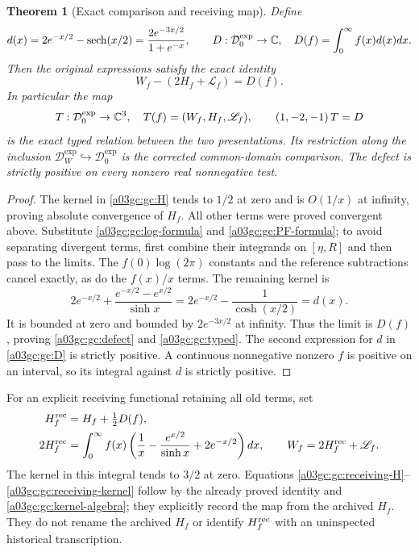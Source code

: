 \documentclass[11pt,a4paper]{article}
\newtheorem{theorem}{Theorem}[section]
\begin{document}
\begin{theorem}[Exact comparison and receiving map]
Define
\begin{equation}
 d(x)=2e^{-x/2}-\operatorname{sech}(x/2)
     =\frac{2e^{-3x/2}}{1+e^{-x}},\qquad
 D:\mathcal D_0^{\exp}\to\mathbb C,\quad D(f)=\int_0^\infty f(x)d(x)dx.
 \label{a03gc:gc:D}
\end{equation}
Then the original expressions satisfy the exact identity
\begin{equation}
 \boxed{W_f-(2H_f+\mathscr L_f)=D(f).}
 \label{a03gc:gc:defect}
\end{equation}
In particular the map
\begin{equation}
 T:\mathcal D_0^{\exp}\to\mathbb C^3,\quad T(f)=(W_f,H_f,\mathscr L_f),
 \qquad (1,-2,-1)\,T=D
 \label{a03gc:gc:typed}
\end{equation}
is the exact typed relation between the two presentations.  Its restriction
along the inclusion $\mathcal D_W^{\exp}\hookrightarrow\mathcal D_0^{\exp}$
is the corrected common-domain comparison.
The defect is strictly positive on every nonzero real nonnegative test.
\end{theorem}
\begin{proof}
The kernel in \eqref{a03gc:gc:H} tends to $1/2$ at zero and is $O(1/x)$ at
infinity, proving absolute convergence of $H_f$.  All other terms were
proved convergent above.  Substitute \eqref{a03gc:gc:log-formula} and
\eqref{a03gc:gc:PF-formula}; to avoid separating divergent terms, first combine
their integrands on $[\eta,R]$ and then pass to the limits.  The
$f(0)\log(2\pi)$ constants and the reference subtractions cancel exactly,
as do the $f(x)/x$ terms.  The remaining kernel is
\begin{equation}
 2e^{-x/2}+\frac{e^{-x/2}-e^{x/2}}{\sinh x}
 =2e^{-x/2}-\frac1{\cosh(x/2)}=d(x).
 \label{a03gc:gc:kernel-algebra}
\end{equation}
It is bounded at zero and bounded by $2e^{-3x/2}$ at infinity.
Thus the limit is $D(f)$, proving \eqref{a03gc:gc:defect} and \eqref{a03gc:gc:typed}.
The second expression for $d$ in \eqref{a03gc:gc:D} is strictly positive.
A continuous nonnegative nonzero $f$ is positive on an interval, so its
integral against $d$ is strictly positive.
\end{proof}

For an explicit receiving functional retaining all old terms, set
\begin{align}
 H_f^{\rm rec}&=H_f+\tfrac12D(f),\label{a03gc:gc:receiving-H}\\
 2H_f^{\rm rec}
 &=\int_0^\infty f(x)
  \left(\frac1x-\frac{e^{x/2}}{\sinh x}+2e^{-x/2}\right)dx,
 \qquad W_f=2H_f^{\rm rec}+\mathscr L_f.
 \label{a03gc:gc:receiving-kernel}
\end{align}
The kernel in this integral tends to $3/2$ at zero.  Equations
\eqref{a03gc:gc:receiving-H}--\eqref{a03gc:gc:receiving-kernel} follow by the already
proved identity and \eqref{a03gc:gc:kernel-algebra}; they explicitly record the
map from the archived $H_f$.  They do not rename the archived $H_f$ or
identify $H_f^{\rm rec}$ with an uninspected historical transcription.
\end{document}
